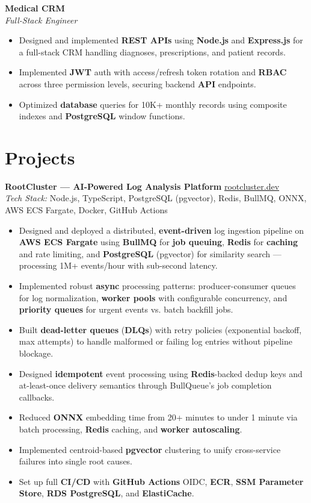 \documentclass[10pt, a4paper]{article}
\begin{document}
\textbf{Medical CRM} \\
{\textit{\textcolor{subtle}{Full-Stack Engineer}}}\\\begin{itemize}
\item Designed and implemented \textbf{REST APIs} using \textbf{Node.js} and \textbf{Express.js} for a full-stack CRM handling diagnoses, prescriptions, and patient records.
\item Implemented \textbf{JWT} auth with access/refresh token rotation and \textbf{RBAC} across three permission levels, securing backend \textbf{API} endpoints.
\item Optimized \textbf{database} queries for 10K+ monthly records using composite indexes and \textbf{PostgreSQL} window functions.
\end{itemize}

\section{Projects}
\textbf{RootCluster — AI-Powered Log Analysis Platform} \href{rootcluster.dev}{rootcluster.dev}\\
\textit{Tech Stack:} Node.js, TypeScript, PostgreSQL (pgvector), Redis, BullMQ, ONNX, AWS ECS Fargate, Docker, GitHub Actions\\
\begin{itemize}
\item Designed and deployed a distributed, \textbf{event-driven} log ingestion pipeline on \textbf{AWS ECS Fargate} using \textbf{BullMQ} for \textbf{job queuing}, \textbf{Redis} for \textbf{caching} and rate limiting, and \textbf{PostgreSQL} (pgvector) for similarity search — processing 1M+ events/hour with sub-second latency.
\item Implemented robust \textbf{async} processing patterns: producer-consumer queues for log normalization, \textbf{worker pools} with configurable concurrency, and \textbf{priority queues} for urgent events vs. batch backfill jobs.
\item Built \textbf{dead-letter queues} (\textbf{DLQs}) with retry policies (exponential backoff, max attempts) to handle malformed or failing log entries without pipeline blockage.
\item Designed \textbf{idempotent} event processing using \textbf{Redis}-backed dedup keys and at-least-once delivery semantics through BullQueue's job completion callbacks.
\item Reduced \textbf{ONNX} embedding time from 20+ minutes to under 1 minute via batch processing, \textbf{Redis} caching, and \textbf{worker autoscaling}.
\item Implemented centroid-based \textbf{pgvector} clustering to unify cross-service failures into single root causes.
\item Set up full \textbf{CI/CD} with \textbf{GitHub Actions} OIDC, \textbf{ECR}, \textbf{SSM Parameter Store}, \textbf{RDS PostgreSQL}, and \textbf{ElastiCache}.
\end{itemize}
\end{document}
